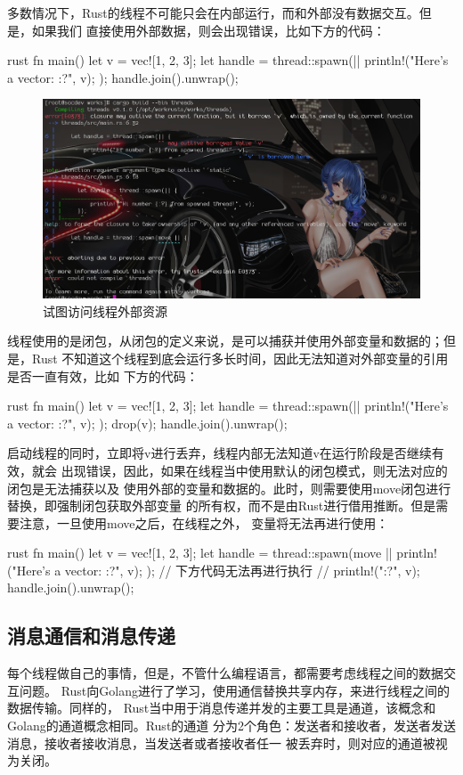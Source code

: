 多数情况下，Rust的线程不可能只会在内部运行，而和外部没有数据交互。但是，如果我们
直接使用外部数据，则会出现错误，比如下方的代码：
\begin{code-block}{rust}
fn main() {
    let v = vec![1, 2, 3];
    let handle = thread::spawn(|| {
        println!("Here's a vector: {:?}", v);
    });
    handle.join().unwrap();
}
\end{code-block}
\begin{figure}[H]
  \centering
  \includegraphics[width=\linewidth]{rust_thread_out_params.png}
  \caption{试图访问线程外部资源}
  \label{fig:rust_thread_out_params}
\end{figure}
线程使用的是闭包，从闭包的定义来说，是可以捕获并使用外部变量和数据的；但是，Rust
不知道这个线程到底会运行多长时间，因此无法知道对外部变量的引用是否一直有效，比如
下方的代码：
\begin{code-block}{rust}
fn main() {
    let v = vec![1, 2, 3];
    let handle = thread::spawn(|| {
        println!("Here's a vector: {:?}", v);
    });
    drop(v);
    handle.join().unwrap();
}
\end{code-block}
启动线程的同时，立即将v进行丢弃，线程内部无法知道v在运行阶段是否继续有效，就会
出现错误，因此，如果在线程当中使用默认的闭包模式，则无法对应的闭包是无法捕获以及
使用外部的变量和数据的。此时，则需要使用move闭包进行替换，即强制闭包获取外部变量
的所有权，而不是由Rust进行借用推断。但是需要注意，一旦使用move之后，在线程之外，
变量将无法再进行使用：
\begin{code-block}{rust}
fn main() {
    let v = vec![1, 2, 3];
    let handle = thread::spawn(move || {
        println!("Here's a vector: {:?}", v);
    });
    // 下方代码无法再进行执行
    // println!("{:?}", v);
    handle.join().unwrap();
}
\end{code-block}

\subsection{消息通信和消息传递}
每个线程做自己的事情，但是，不管什么编程语言，都需要考虑线程之间的数据交互问题。
Rust向Golang进行了学习，使用通信替换共享内存，来进行线程之间的数据传输。同样的，
Rust当中用于消息传递并发的主要工具是通道，该概念和Golang的通道概念相同。Rust的通道
分为2个角色：发送者和接收者，发送者发送消息，接收者接收消息，当发送者或者接收者任一
被丢弃时，则对应的通道被视为关闭。

